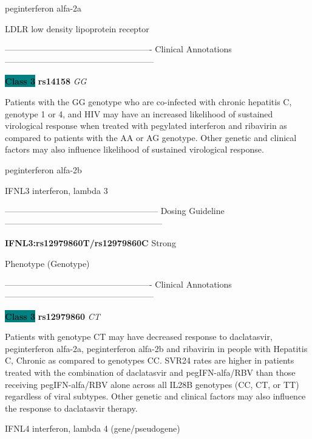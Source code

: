 \documentclass{resume} %
\begin{document}
\begin{rSection}{ peginterferon alfa-2a }
\begin{rSubsection}{ LDLR }{ low density lipoprotein receptor }{}{}
\item[] ---------------------------------------------------- Clinical Annotations -----------------------------------------------------\newline
\item \textbf{\colorbox{teal} {Class 3}} \textbf{ rs14158 } \textit{ GG }
\item[] Patients with the GG genotype who are co-infected with chronic hepatitis C, genotype 1 or 4, and HIV may have an increased likelihood of sustained virological response when treated with pegylated interferon and ribavirin as compared to patients with the AA or AG genotype. Other genetic and clinical factors may also influence likelihood of sustained virological response. 
\end{rSubsection}

\end{rSection}\begin{rSection}{ peginterferon alfa-2b }
\item[]

\begin{rSubsection}{ IFNL3 }{ interferon, lambda 3 }{}{}
\item[]
\item[] ------------------------------------------------------ Dosing Guideline --------------------------------------------------------\newline
\item[]
\item[] \textbf{ IFNL3:rs12979860T/rs12979860C } Strong
\item[] Phenotype (Genotype)\newline
\item[] 
\item[] ---------------------------------------------------- Clinical Annotations -----------------------------------------------------\newline
\item \textbf{\colorbox{teal} {Class 3}} \textbf{ rs12979860 } \textit{ CT }
\item[] Patients with genotype CT may have decreased response to daclatasvir, peginterferon alfa-2a, peginterferon alfa-2b and ribavirin in people with Hepatitis C, Chronic as compared to genotypes CC. SVR24 rates are higher in patients treated with the combination of daclatasvir and pegIFN-alfa/RBV than those receiving pegIFN-alfa/RBV alone across all IL28B genotypes (CC, CT, or TT) regardless of viral subtypes. Other genetic and clinical factors may also influence the response to daclatasvir therapy.
\end{rSubsection}\begin{rSubsection}{ IFNL4 }{ interferon, lambda 4 (gene/pseudogene) }{}{}
\item[]


\end{rSubsection}
\end{rSection}
\end{document}
